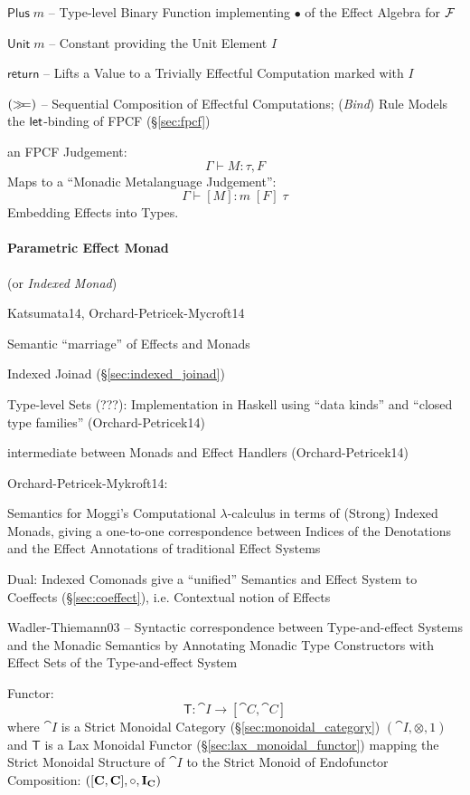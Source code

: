 $\mathsf{Plus}\;m$ -- Type-level Binary Function implementing $\bullet$
of the Effect Algebra for $\mathcal{F}$

$\mathsf{Unit}\;m$ -- Constant providing the Unit Element $I$

$\mathsf{return}$ -- Lifts a Value to a Trivially Effectful
Computation marked with $I$

$(\mathsf{\gg\kern-3pt=})$ -- Sequential Composition of Effectful Computations;
(\emph{Bind}) Rule Models the $\mathsf{let}$-binding of FPCF
(\S\ref{sec:fpcf})

an FPCF Judgement:
\[
  \Gamma \vdash M:\tau,F
\]
Maps to a ``Monadic Metalanguage Judgement'': %
\[
  \Gamma \vdash [M]:m\;[F]\;\tau
\]
Embedding Effects into Types. \cite{wadler-thiemann03}




\paragraph{Parametric Effect Monad}
\label{sec:parametric_effect_monad} \hfill

(or \emph{Indexed Monad})

Katsumata14, Orchard-Petricek-Mycroft14

Semantic ``marriage'' of Effects and Monads

Indexed Joinad (\S\ref{sec:indexed_joinad})

Type-level Sets (???): Implementation in Haskell using ``data kinds''
and ``closed type families'' (Orchard-Petricek14) %

intermediate between Monads and Effect Handlers (Orchard-Petricek14)


Orchard-Petricek-Mykroft14:

Semantics for Moggi's Computational $\lambda$-calculus in terms of (Strong)
Indexed Monads, giving a one-to-one correspondence between Indices of the
Denotations and the Effect Annotations of traditional Effect Systems

Dual: Indexed Comonads give a ``unified'' Semantics and Effect System to
Coeffects (\S\ref{sec:coeffect}), i.e. Contextual notion of Effects

Wadler-Thiemann03 -- Syntactic correspondence between Type-and-effect Systems
and the Monadic Semantics by Annotating Monadic Type Constructors with Effect
Sets of the Type-and-effect System

Functor:
\[
  \mathsf{T} : \cat{I} \rightarrow [\cat{C},\cat{C}]
\]
where $\cat{I}$ is a Strict Monoidal Category
(\S\ref{sec:monoidal_category}) $(\cat{I}, \otimes, 1)$ and
$\mathsf{T}$ is a Lax Monoidal Functor
(\S\ref{sec:lax_monoidal_functor}) mapping the Strict Monoidal
Structure of $\cat{I}$ to the Strict Monoid of Endofunctor
Composition: $([\mathbf{C},\mathbf{C}],\circ,\mathbf{I}_\mathbf{C})$




